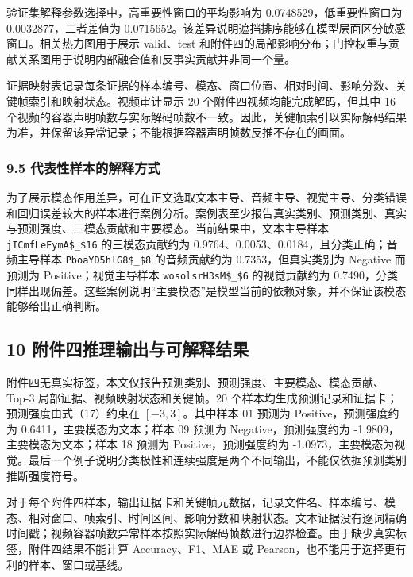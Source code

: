 \documentclass[
  12pt,
  a4paper,
]{ctexart}
\begin{document}
验证集解释参数选择中，高重要性窗口的平均影响为 0.0748529，低重要性窗口为
0.0032877，二者差值为
0.0715652。该差异说明遮挡排序能够在模型层面区分敏感窗口。相关热力图用于展示
valid、test
和附件四的局部影响分布；门控权重与贡献关系图用于说明内部融合值和反事实贡献并非同一个量。

证据映射表记录每条证据的样本编号、模态、窗口位置、相对时间、影响分数、关键帧索引和映射状态。视频审计显示
20 个附件四视频均能完成解码，但其中 16
个视频的容器声明帧数与实际解码帧数不一致。因此，关键帧索引以实际解码结果为准，并保留该异常记录；不能根据容器声明帧数反推不存在的画面。

\hypertarget{ux4ee3ux8868ux6027ux6837ux672cux7684ux89e3ux91caux65b9ux5f0f}{%
\subsubsection{9.5
代表性样本的解释方式}\label{ux4ee3ux8868ux6027ux6837ux672cux7684ux89e3ux91caux65b9ux5f0f}}

为了展示模态作用差异，可在正文选取文本主导、音频主导、视觉主导、分类错误和回归误差较大的样本进行案例分析。案例表至少报告真实类别、预测类别、真实与预测强度、三模态贡献和主要模态。当前结果中，文本主导样本
\texttt{jICmfLeFymA\$\_\$16} 的三模态贡献约为
0.9764、0.0053、0.0184，且分类正确；音频主导样本
\texttt{PboaYD5hlG8\$\_\$8} 的音频贡献约为 0.7353，但真实类别为 Negative
而预测为 Positive；视觉主导样本 \texttt{wosolsrH3sM\$\_\$6}
的视觉贡献约为
0.7490，分类同样出现偏差。这些案例说明``主要模态''是模型当前的依赖对象，并不保证该模态能够给出正确判断。

\hypertarget{ux9644ux4ef6ux56dbux63a8ux7406ux8f93ux51faux4e0eux53efux89e3ux91caux7ed3ux679c}{%
\subsection{10
附件四推理输出与可解释结果}\label{ux9644ux4ef6ux56dbux63a8ux7406ux8f93ux51faux4e0eux53efux89e3ux91caux7ed3ux679c}}

附件四无真实标签，本文仅报告预测类别、预测强度、主要模态、模态贡献、Top-3
局部证据、视频映射状态和关键帧。20
个样本均生成预测记录和证据卡；预测强度由式（17）约束在
\([-3,3]\)。其中样本 01 预测为 Positive，预测强度约为
0.6411，主要模态为文本；样本 09 预测为 Negative，预测强度约为
-1.9809，主要模态为文本；样本 18 预测为 Positive，预测强度约为
-1.0973，主要模态为视觉。最后一个例子说明分类极性和连续强度是两个不同输出，不能仅依据预测类别推断强度符号。

对于每个附件四样本，输出证据卡和关键帧元数据，记录文件名、样本编号、模态、相对窗口、帧索引、时间区间、影响分数和映射状态。文本证据没有逐词精确时间戳；视频容器帧数异常样本按照实际解码帧数进行边界检查。由于缺少真实标签，附件四结果不能计算
Accuracy、F1、MAE 或 Pearson，也不能用于选择更有利的样本、窗口或基线。
\end{document}
